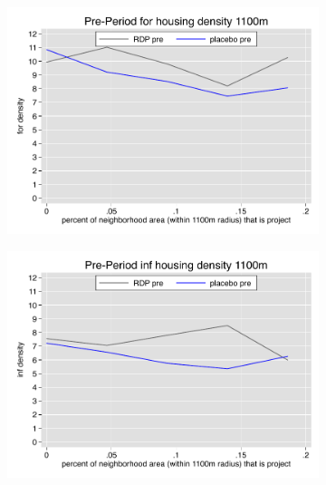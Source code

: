 \documentclass[12pt]{article}
\begin{document}
\begin{figure}
        \begin{subfigure}[b]{0.495\textwidth}
            \centering
            \includegraphics[width=\textwidth,trim={0.3cm .3cm 0.1cm 0cm}, clip=true]{figures/overlap_for_1100_total_pre.pdf}
        \end{subfigure}
        \hfill
        \begin{subfigure}[b]{0.495\textwidth}  
            \centering 
            \includegraphics[width=\textwidth,trim={0.3cm .3cm 0.1cm 0cm}, clip=true]{figures/overlap_inf_1100_total_pre.pdf}
        \end{subfigure}
        \vspace{-6mm}

\end{figure}
\end{document}
